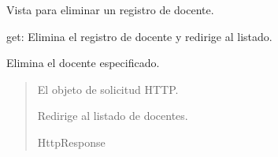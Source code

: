 \documentclass[letterpaper,10pt,spanish]{sphinxmanual}
\begin{document}
\begin{fulllineitems}
\begin{fulllineitems}
\end{fulllineitems}



\begin{fulllineitems}

\pysigstartsignatures
{}
\pysigstopsignatures
\end{fulllineitems}


\end{fulllineitems}



\begin{fulllineitems}

\pysigstartsignatures
{}
\pysigstopsignatures
\sphinxAtStartPar
Vista para eliminar un registro de docente.
\begin{description}
\sphinxAtStartPar
get: Elimina el registro de docente y redirige al listado.

\end{description}


\begin{fulllineitems}

\pysigstartsignatures
{}
\pysigstopsignatures
\sphinxAtStartPar
Elimina el docente especificado.
\begin{quote}\begin{description}
\sphinxAtStartPar
{} \textendash{} El objeto de solicitud HTTP.

\sphinxAtStartPar
Redirige al listado de docentes.

\sphinxAtStartPar
HttpResponse

\end{description}\end{quote}

\end{fulllineitems}


\end{fulllineitems}
\end{document}
